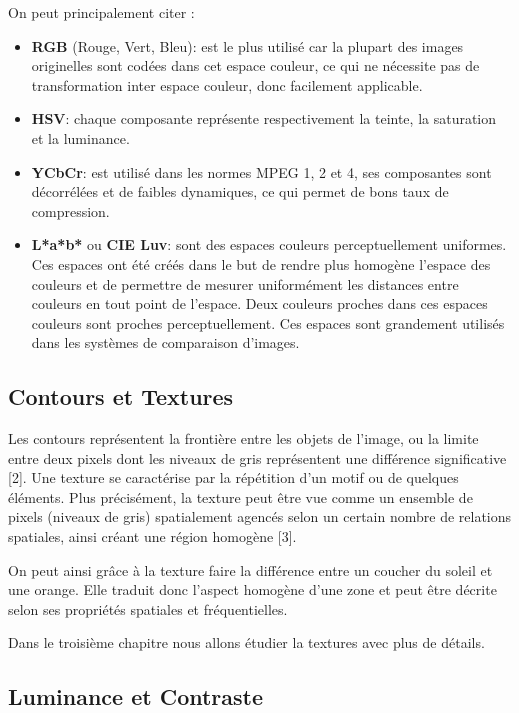 On peut principalement citer :
\begin{itemize}
	\item \textbf{RGB} (Rouge, Vert, Bleu): est le plus utilisé car la plupart des images originelles sont codées dans cet espace couleur, ce qui ne nécessite pas de transformation inter espace couleur, donc facilement applicable.
	
	\item \textbf{HSV}: chaque composante représente respectivement la teinte, la saturation et la luminance.
	
	\item \textbf{YCbCr}: est utilisé dans les normes MPEG 1, 2 et 4, ses composantes sont décorrélées et de faibles dynamiques, ce qui permet de bons taux de compression.
	
	\item \textbf{L*a*b*} ou \textbf{CIE Luv}: sont des espaces couleurs perceptuellement uniformes. Ces espaces ont été créés dans le but de rendre plus homogène l’espace des couleurs et de
	permettre de mesurer uniformément les distances entre couleurs en tout point de l'espace. Deux couleurs proches dans ces espaces couleurs sont proches perceptuellement. Ces espaces sont grandement utilisés dans les systèmes de comparaison d'images.
\end{itemize}

\subsection{Contours et Textures}
Les contours représentent la frontière entre les objets de l’image, ou la
limite entre deux pixels dont les niveaux de gris représentent une différence
significative [2]. Une texture se caractérise par la répétition d’un motif ou de quelques éléments. Plus précisément, la texture peut être vue comme un
ensemble de pixels (niveaux de gris) spatialement agencés selon un certain
nombre de relations spatiales, ainsi créant une région homogène [3].

On peut ainsi grâce à la texture faire la différence entre un coucher du soleil et une orange. Elle traduit donc l’aspect homogène d’une zone et peut être décrite selon ses propriétés spatiales et fréquentielles.

Dans le troisième chapitre nous allons étudier la textures avec plus de détails.

\subsection{Luminance et Contraste}

